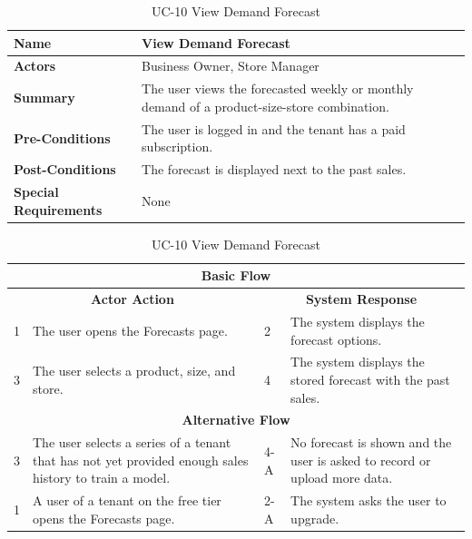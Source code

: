 \documentclass{StockSense}
\begin{document}
\begin{table}[!htbp]
\centering
\vspace*{2\baselineskip}
\caption{UC-10 View Demand Forecast}
{\normalsize\linespread{1.10}\selectfont
\begin{tabular}{|p{}|p{}|}
\hline
\textbf{Name} & View Demand Forecast \\ \hline
\textbf{Actors} & Business Owner, Store Manager \\ \hline
\textbf{Summary} & The user views the forecasted weekly or monthly demand of a product-size-store combination. \\ \hline
\textbf{Pre-Conditions} & The user is logged in and the tenant has a paid subscription. \\ \hline
\textbf{Post-Conditions} & The forecast is displayed next to the past sales. \\ \hline
\textbf{Special Requirements} & None \\ \hline
\end{tabular}\par\nointerlineskip
\begin{tabular}{|p{}|p{}|p{}|p{}|}
\multicolumn{4}{|c|}{\textbf{Basic Flow}} \\ \hline
\multicolumn{2}{|c|}{\textbf{Actor Action}} & \multicolumn{2}{c|}{\textbf{System Response}} \\ \hline
1 & The user opens the Forecasts page. & 2 & The system displays the forecast options. \\ \hline
3 & The user selects a product, size, and store. & 4 & The system displays the stored forecast with the past sales. \\ \hline
\multicolumn{4}{|c|}{\textbf{Alternative Flow}} \\ \hline
3 & The user selects a series of a tenant that has not yet provided enough sales history to train a model. & 4-A & No forecast is shown and the user is asked to record or upload more data. \\ \hline
1 & A user of a tenant on the free tier opens the Forecasts page. & 2-A & The system asks the user to upgrade. \\ \hline
\end{tabular}\par}
\end{table}
\end{document}

